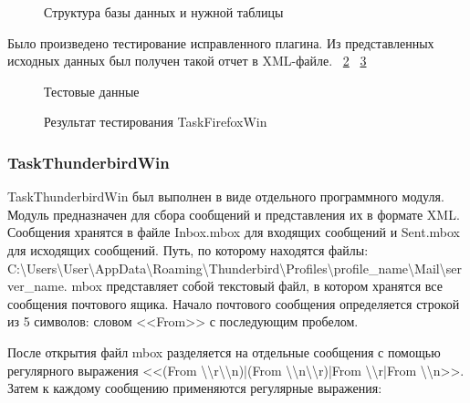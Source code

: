 \begin{figure}[h!]
\caption{ Структура базы данных и нужной таблицы }
\label{teresh_3:teresh_3}
\end{figure}

Было произведено тестирование исправленного плагина. Из представленных исходных данных был получен такой отчет в XML-файле.
~\ref{teresh_4:teresh_4}
~\ref{teresh_5:teresh_5} 

\begin{figure}[h!]
\caption{ Тестовые данные }
\label{teresh_4:teresh_4}
\end{figure}

\begin{figure}[h!]
\caption{ Результат тестирования TaskFirefoxWin }
\label{teresh_5:teresh_5}
\end{figure}

\subsubsection{TaskThunderbirdWin}

TaskThunderbirdWin был выполнен в виде отдельного программного модуля. Модуль предназначен для сбора сообщений и представления их в формате XML. Сообщения хранятся в файле Inbox.mbox для входящих сообщений и Sent.mbox для исходящих сообщений. Путь, по которому находятся файлы: C:\textbackslash Users\textbackslash User\textbackslash AppData\textbackslash Roaming\textbackslash Thunderbird\textbackslash Profiles\textbackslash profile\_name\textbackslash Mail\textbackslash server\_name. mbox представляет собой текстовый файл, в котором хранятся все сообщения почтового ящика. Начало почтового сообщения определяется строкой из 5 символов: словом <<From>> с последующим пробелом.

После открытия файл mbox разделяется на отдельные сообщения с помощью регулярного выражения <<(From \textbackslash \textbackslash r\textbackslash \textbackslash n)|(From \textbackslash \textbackslash n\textbackslash \textbackslash r)|From \textbackslash \textbackslash r|From \textbackslash \textbackslash n>>. Затем к каждому сообщению применяются регулярные выражения:

